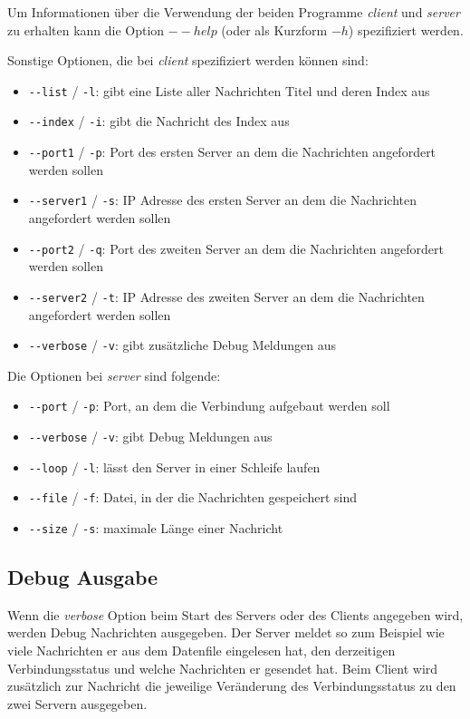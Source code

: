 \documentclass[]{article}
\begin{document}
Um Informationen über die Verwendung der beiden Programme \textit{client} und \textit{server} zu erhalten kann die Option $--help$ (oder als Kurzform $-h$) spezifiziert werden.

Sonstige Optionen, die bei \textit{client} spezifiziert werden können sind:

\begin{itemize}
	\item \verb|--list| / \verb|-l|: gibt eine Liste aller Nachrichten Titel und deren Index aus
	\item \verb|--index| / \verb|-i|: gibt die Nachricht des Index aus
	\item \verb|--port1| / \verb|-p|: Port des ersten Server an dem die Nachrichten angefordert werden sollen
	\item \verb|--server1| / \verb|-s|: IP Adresse des ersten Server an dem die Nachrichten angefordert werden sollen
	\item \verb|--port2| / \verb|-q|: Port des zweiten Server an dem die Nachrichten angefordert werden sollen
	\item \verb|--server2| / \verb|-t|: IP Adresse des zweiten Server an dem die Nachrichten angefordert werden sollen
	\item \verb|--verbose| / \verb|-v|: gibt zusätzliche Debug Meldungen aus
\end{itemize}

\noindent
Die Optionen bei \textit{server} sind folgende:

\begin{itemize}
	\item \verb|--port| / \verb|-p|: Port, an dem die Verbindung aufgebaut werden soll
	\item \verb|--verbose| / \verb|-v|: gibt Debug Meldungen aus
	\item \verb|--loop| / \verb|-l|: lässt den Server in einer Schleife laufen
	\item \verb|--file| / \verb|-f|: Datei, in der die Nachrichten gespeichert sind
	\item \verb|--size| / \verb|-s|: maximale Länge einer Nachricht
\end{itemize}

\subsection{Debug Ausgabe}
Wenn die \textit{verbose} Option beim Start des Servers oder des Clients angegeben wird, werden Debug Nachrichten ausgegeben. Der Server meldet so zum Beispiel wie viele Nachrichten er aus dem Datenfile eingelesen hat, den derzeitigen Verbindungsstatus und welche Nachrichten er gesendet hat. Beim Client wird zusätzlich zur Nachricht die jeweilige Veränderung des Verbindungsstatus zu den zwei Servern ausgegeben.
\end{document}
